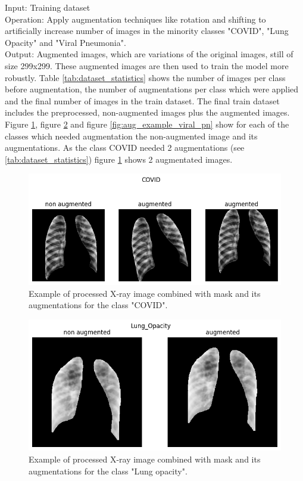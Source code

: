 \documentclass{article}
\begin{document}
Input: Training dataset \\%
Operation: Apply augmentation techniques like rotation and shifting to artificially increase number of images in the minority classes "COVID", "Lung Opacity" and 
"Viral Pneumonia".\\
Output: Augmented images, which are variations of the original images, still of size 299x299. These augmented images are then used to train the model more robustly. 
Table \ref{tab:dataset_statistics} shows the number of images per class before augmentation, the number of augmentations per class which were applied and the
final number of images in the train dataset. The final train dataset includes the preprocessed, non-augmented images plus the augmented images.\\
Figure \ref{fig:aug_example_covid}, figure \ref{fig:aug_example_lung_opcacity} and figure \ref{fig:aug_example_viral_pn} show for each of the classes which needed 
augmentation the non-augmented image and its augmentations. As the class COVID needed 2 augmentations (see \ref{tab:dataset_statistics}) figure \ref{fig:aug_example_covid} 
shows 2 augmentated images. 


\begin{figure}[!htb] %
    \centering
    \includegraphics[width=1.0\linewidth]{aug_example_covid.png}
    \caption{Example of processed X-ray image combined with mask and its augmentations for the class "COVID".}
    \label{fig:aug_example_covid}
\end{figure}

\begin{figure}[H] %
    \centering
    \includegraphics[width=0.65\linewidth]{aug_example_lung_opcacity.png}
    \caption{Example of processed X-ray image combined with mask and its augmentations for the class "Lung opacity".}
    \label{fig:aug_example_lung_opcacity}
\end{figure}
\end{document}
